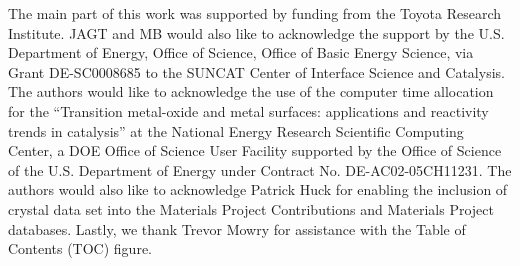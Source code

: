 

The main part of this work was supported by funding from the Toyota Research Institute. JAGT and MB would also like to acknowledge the support by the U.S. Department of Energy, Office
of Science, Office of Basic Energy Science, via Grant DE-SC0008685 to the SUNCAT Center of Interface Science and Catalysis.
The authors would like to acknowledge the use of the computer time allocation for the
“Transition metal-oxide and metal surfaces: applications and
reactivity trends in catalysis”
at the National Energy Research Scientific Computing Center, a DOE Office of Science User Facility supported by the Office of Science of the U.S. Department of Energy under Contract No. DE-AC02-05CH11231.
The authors would also like to acknowledge Patrick Huck for enabling
the inclusion of \IrOx crystal data set into the Materials Project Contributions and Materials Project databases. Lastly, we thank Trevor Mowry for assistance with the Table of Contents (TOC) figure.

